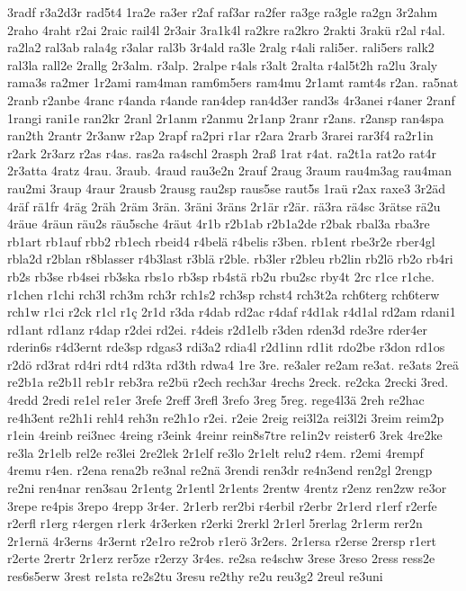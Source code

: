 {3radf
r3a2d3r
rad5t4
1ra2e
ra3er
r2af
raf3ar
ra2fer
ra3ge
ra3gle
ra2gn
3r2ahm
2raho
4raht
r2ai
2raic
rail4l
2r3air
3ra1k4l
ra2kre
ra2kro
2rakti
3rakü
r2al
r4al.
ra2la2
ral3ab
rala4g
r3alar
ral3b
3r4ald
ra3le
2ralg
r4ali
rali5er.
rali5ers
ralk2
ral3la
rall2e
2rallg
2r3alm.
r3alp.
2ralpe
r4als
r3alt
2ralta
r4al5t2h
ra2lu
3raly
rama3s
ra2mer
1r2ami
ram4man
ram6m5ers
ram4mu
2r1amt
ramt4s
r2an.
ra5nat
2ranb
r2anbe
4ranc
r4anda
r4ande
ran4dep
ran4d3er
rand3s
4r3anei
r4aner
2ranf
1rangi
rani1e
ran2kr
2ranl
2r1anm
r2anmu
2r1anp
2ranr
r2ans.
r2ansp
ran4spa
ran2th
2rantr
2r3anw
r2ap
2rapf
ra2pri
r1ar
r2ara
2rarb
3rarei
rar3f4
ra2r1in
r2ark
2r3arz
r2as
r4as.
ras2a
ra4schl
2rasph
2raß
1rat
r4at.
ra2t1a
rat2o
rat4r
2r3atta
4ratz
4rau.
3raub.
4raud
rau3e2n
2rauf
2raug
3raum
rau4m3ag
rau4man
rau2mi
3raup
4raur
2rausb
2rausg
rau2sp
raus5se
raut5s
1raü
r2ax
raxe3
3r2äd
4räf
rä1fr
4räg
2räh
2räm
3rän.
3räni
3räns
2r1är
r2är.
rä3ra
rä4sc
3rätse
rä2u
4räue
4räun
räu2s
räu5sche
4räut
4r1b
r2b1ab
r2b1a2de
r2bak
rbal3a
rba3re
rb1art
rb1auf
rbb2
rb1ech
rbeid4
r4belä
r4belis
r3ben.
rb1ent
rbe3r2e
rber4gl
rbla2d
r2blan
r8blasser
r4b3last
r3blä
r2ble.
rb3ler
r2bleu
rb2lin
rb2lö
rb2o
rb4ri
rb2s
rb3se
rb4sei
rb3ska
rbs1o
rb3sp
rb4stä
rb2u
rbu2sc
rby4t
2rc
r1ce
r1che.
r1chen
r1chi
rch3l
rch3m
rch3r
rch1s2
rch3sp
rchst4
rch3t2a
rch6terg
rch6terw
rch1w
r1ci
r2ck
r1cl
r1ç
2r1d
r3da
r4dab
rd2ac
r4daf
r4d1ak
r4d1al
rd2am
rdani1
rd1ant
rd1anz
r4dap
r2dei
rd2ei.
r4deis
r2d1elb
r3den
rden3d
rde3re
rder4er
rderin6s
r4d3ernt
rde3sp
rdgas3
rdi3a2
rdia4l
r2d1inn
rd1it
rdo2be
r3don
rd1os
r2dö
rd3rat
rd4ri
rdt4
rd3ta
rd3th
rdwa4
1re
3re.
re3aler
re2am
re3at.
re3ats
2reä
re2b1a
re2b1l
reb1r
reb3ra
re2bü
r2ech
rech3ar
4rechs
2reck.
re2cka
2recki
3red.
4redd
2redi
re1el
re1er
3refe
2reff
3refl
3refo
3reg
5reg.
rege4l3ä
2reh
re2hac
re4h3ent
re2h1i
rehl4
reh3n
re2h1o
r2ei.
r2eie
2reig
rei3l2a
rei3l2i
3reim
reim2p
r1ein
4reinb
rei3nec
4reing
r3eink
4reinr
rein8s7tre
re1in2v
reister6
3rek
4re2ke
re3la
2r1elb
rel2e
re3lei
2re2lek
2r1elf
re3lo
2r1elt
relu2
r4em.
r2emi
4rempf
4remu
r4en.
r2ena
rena2b
re3nal
re2nä
3rendi
ren3dr
re4n3end
ren2gl
2rengp
re2ni
ren4nar
ren3sau
2r1entg
2r1entl
2r1ents
2rentw
4rentz
r2enz
ren2zw
re3or
3repe
re4pis
3repo
4repp
3r4er.
2r1erb
rer2bi
r4erbil
r2erbr
2r1erd
r1erf
r2erfe
r2erfl
r1erg
r4ergen
r1erk
4r3erken
r2erki
2rerkl
2r1erl
5rerlag
2r1erm
rer2n
2r1ernä
4r3erns
4r3ernt
r2e1ro
re2rob
r1erö
3r2ers.
2r1ersa
r2erse
2rersp
r1ert
r2erte
2rertr
2r1erz
rer5ze
r2erzy
3r4es.
re2sa
re4schw
3rese
3reso
2ress
ress2e
res6s5erw
3rest
re1sta
re2s2tu
3resu
re2thy
re2u
reu3g2
2reul
re3uni
}
